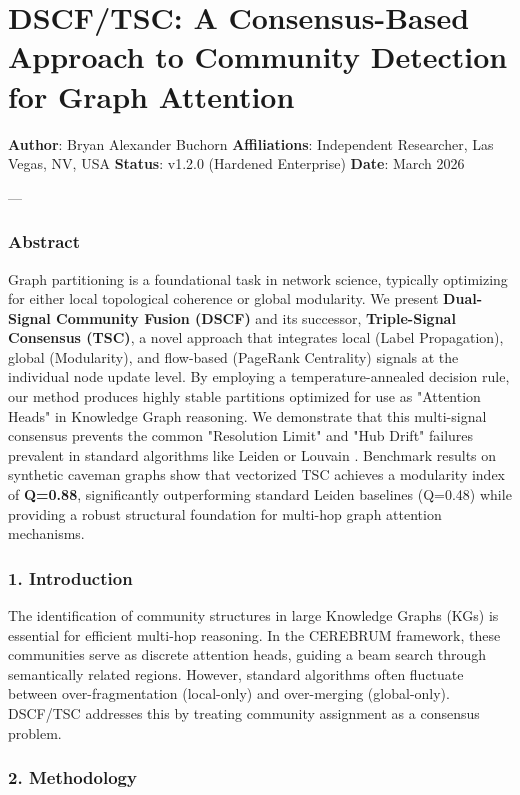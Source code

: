 \section{DSCF/TSC: A Consensus-Based Approach to Community Detection for Graph Attention}

\textbf{Author}: Bryan Alexander Buchorn  
\textbf{Affili\-ations}: Independent Researcher, Las Vegas, NV, USA  
\textbf{Status}: v1.2.0 (Hardened Enterprise)  
\textbf{Date}: March 2026

---

\subsubsection{Abstract}
Graph parti\-tioning is a found\-ational task in network science, typically optimizing for either local topological coherence or global modularity. We present \textbf{Dual-Signal Community Fusion (DSCF)} and its successor, \textbf{Triple-Signal Consensus (TSC)}, a novel approach that integrates local (Label Propagation), global (Modularity), and flow-based (PageRank Centrality) signals at the individual node update level. By employing a temperature-annealed decision rule, our method produces highly stable partitions optimized for use as "Attention Heads" in Knowledge Graph reasoning. We demonstrate that this multi-signal consensus prevents the common "Resolution Limit" and "Hub Drift" failures prevalent in standard algorithms like Leiden \cite{traag2019louvain} or Louvain \cite{blondel2008louvain}. Benchmark results on synthetic caveman graphs show that vectorized TSC achieves a modularity index of \textbf{Q=0.88}, signi\-ficantly outpe\-rforming standard Leiden baselines (Q=0.48) while providing a robust structural foundation for multi-hop graph attention mechanisms.

\subsubsection{1. Introd\-uction}
The ident\-ification of community structures in large Knowledge Graphs (KGs) is essential for efficient multi-hop reasoning. In the CEREBRUM framework, these communities serve as discrete attention heads, guiding a beam search through seman\-tically related regions. However, standard algorithms often fluctuate between over-fragm\-entation (local-only) and over-merging (global-only). DSCF/TSC addresses this by treating community assignment as a consensus problem.

\subsubsection{2. Methodology}

